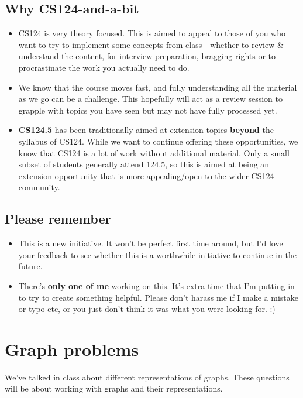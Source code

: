 \documentclass{article}
\begin{document}
\subsection{Why CS124-and-a-bit}

\begin{itemize}
    \item CS124 is very theory focused. This is aimed to appeal to those of you who want to try to implement some concepts from class - whether to review & understand the content, for interview preparation, bragging rights or to procrastinate the work you actually need to do.
    \item We know that the course moves fast, and fully understanding all the material as we go can be a challenge. This hopefully will act as a review session to grapple with topics you have seen but may not have fully processed yet.
    \item \textbf{CS124.5} has been traditionally aimed at extension topics \textbf{beyond} the syllabus of CS124. While we want to continue offering these opportunities, we know that CS124 is a lot of work without additional material. Only a small subset of students generally attend 124.5, so this is aimed at being an extension opportunity that is more appealing/open to the wider CS124 community. 
\end{itemize}

\subsection{Please remember}
\begin{itemize}
    \item This is a new initiative. It won't be perfect first time around, but I'd love your feedback to see whether this is a worthwhile initiative to continue in the future.
    \item There's \textbf{only one of me} working on this. It's extra time that I'm putting in to try to create something helpful. Please don't harass me if I make a mistake or typo etc, or you just don't think it was what you were looking for. :)
\end{itemize}


\newpage
\section{Graph problems}

We've talked in class about different representations of graphs. These questions will be about working with graphs and their representations.
\end{document}
